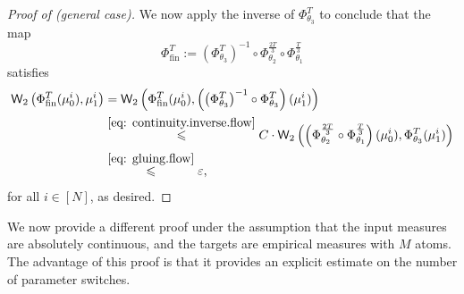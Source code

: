 \documentclass[a4paper,11pt]{article}
\theoremstyle{plain}
\renewcommand{\leq}{\leqslant}
\numberwithin{equation}{section}
\begin{document}
\begin{proof}[Proof of  (general case)]
We now apply the inverse of $\Phi_{\theta_3}^{T}$ to conclude that
the map
\begin{equation*}
\Phi_{\text{fin}}^T:=\left(\Phi_{\theta_3}^{T}\right)^{-1}\circ\Phi_{\theta_2}^{\frac{2T}{3}}\circ \Phi_{\theta_1}^{\frac{T}{3}}
\end{equation*}
satisfies
\begin{align*}
\mathsf{W}_2\left(\Phi_{\text{fin}}^T (\mu_0^i),\mu_1^i\right) &= \mathsf{W}_2\left(\Phi_{\text{fin}}^T (\mu_0^i), \left(\left(\Phi_{\theta_3}^T\right)^{-1}\circ\Phi_{\theta_3}^T\right) (\mu_1^i)\right)\\
    &\overset{\eqref{eq: continuity.inverse.flow}}{\leq}  C\cdot\mathsf{W}_2\left(\left(\Phi_{\theta_2}^{\frac{2T}{3}}\circ \Phi_{\theta_1}^{\frac{T}{3}}\right) (\mu_0^i),\Phi_{\theta_3}^T (\mu_1^i)\right)\\
    &\overset{\eqref{eq: gluing.flow}}{\leq}\varepsilon,
\end{align*}
for all $i\in[N]$, as desired.
\end{proof}

We now provide a different proof under the assumption that the input measures are absolutely continuous, and the targets are empirical measures with $M$ atoms. The advantage of this proof is that it provides an explicit estimate on the number of parameter switches.
\end{document}
